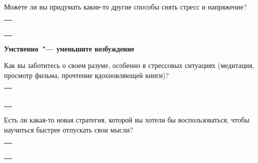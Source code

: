 \begin{itemize}
	\itemWritingHand Можете ли вы придумать какие-то другие способы снять стресс и напряжение?
\end{itemize}

\setlength{\extrarowheight}{2mm}
\begin{tabularx}{\textwidth}{X}
	\\
	\arrayrulecolor{gray}\hline\\
	\hline\\
	\hline\\
	\hline\\
	\hline\\
	\hline\\
\end{tabularx}
\setlength{\extrarowheight}{0mm}

\vspace{5ex}

{\large \textbf{Умственно~"--- уменьшите возбуждение}}

\begin{itemize}
	\itemWritingHand Как вы заботитесь о своем разуме, особенно в стрессовых ситуациях (медитация, просмотр фильма, прочтение вдохновляющей книги)?
\end{itemize}

\setlength{\extrarowheight}{2mm}
\begin{tabularx}{\textwidth}{X}
	\\
	\arrayrulecolor{gray}\hline\\
	\hline\\
	\hline\\
	\hline\\
	\hline\\
	\hline\\
	\hline\\
\end{tabularx}
\setlength{\extrarowheight}{0mm}
	
\begin{itemize}
	\itemWritingHand Есть ли какая-то новая стратегия, которой вы хотели бы воспользоваться, чтобы научиться быстрее отпускать свои мысли?
\end{itemize}

\setlength{\extrarowheight}{2mm}
\begin{tabularx}{\textwidth}{X}
	\\
	\arrayrulecolor{gray}\hline\\
	\hline\\
	\hline\\
	\hline\\
	\hline\\
	\hline\\
\end{tabularx}
\setlength{\extrarowheight}{0mm}


